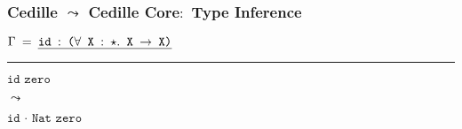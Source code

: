 \documentclass[11pt]{beamer}
\newcommand{\cedtext}[1]{\emph{$\texttt{#1}$}}
\newcommand{\lamxxx}[0]{$\lambda$ x$.$ x x}
\newcommand{\checkagainst}[2]{
\textcolor{black}{\cedtext{#2}}


\textcolor{black}{$\Downarrow$}


\textcolor{colorced}{\cedtext{#1}}
}
\newcommand{\elabrule}[4]{
\begin{frame}[t]
\frametitle{\textcolor{colorced}{Cedille} $\leadsto$ \textcolor{colorcedcore}{Cedille Core}$:$ {#1}}
\vspace{1cm}
\textcolor{darkgray}{\cedtext{$\Gamma$ $=$ \cedtext{#2}}}
\noindent\rule{\textwidth}{0.2pt}

\vfill
\begin{center}
#3

$\leadsto$

\textcolor{colorcedcore}{\cedtext{#4}}

\end{center}
\vfill

\end{frame}
}
\newcommand{\elabruleb}[6]{
\begin{frame}[t]
\frametitle{\textcolor{colorced}{Cedille} $\leadsto$ \textcolor{colorcedcore}{Cedille Core}$:$ {#1}}
\vspace{1cm}
\textcolor{darkgray}{\cedtext{$\Gamma$ $=$} \cedtext{#2}}
\newline
\qquad\textcolor{darkgray}{\qquad\cedtext{#3}}
\noindent\rule{\textwidth}{0.2pt}

\vfill
\begin{center}
#4

$\leadsto$

\textcolor{colorcedcore}{\cedtext{#5}}

\textcolor{colorcedcore}{\cedtext{#6}}

\end{center}
\vfill

\end{frame}

}
\begin{document}

\elabrule
  {Type Inference}
  {id $:$ ($\forall$ X $:$ $\star.$ X $\rightarrow$ X)}
  {\textcolor{colorced}{\cedtext{id zero}}}
  {id · Nat zero}
  


%
%
%
%
%
%
%
%
\end{document}
